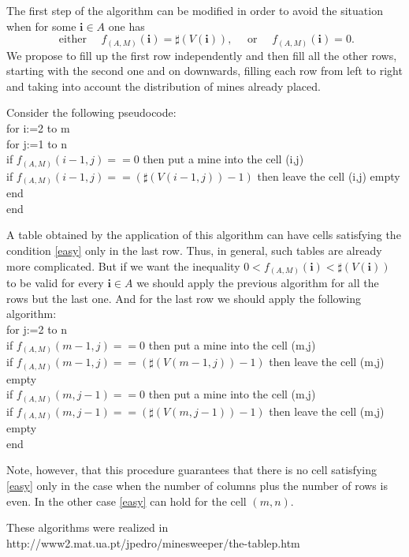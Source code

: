\documentclass[english,12pt]{article}
\theoremstyle{remark}
\theoremstyle{definition}
\theoremstyle{definition}
\newcommand{\bsi}{{\boldsymbol i}}
\begin{document}
The first step of the algorithm can be modified in order to avoid the situation when for some $\bsi
\in A$ one has
\begin{equation}\label{easy}
\text{ either }\quad f_{(A,M)}(\bsi) =\sharp(V(\bsi)),\quad\text{ or }\quad f_{(A,M)}(\bsi)=0.
\end{equation}
We propose to fill up the first row independently and then fill all the other rows, starting with
the second one and on downwards, filling each row from left to right and taking into account the
distribution of mines already placed.

Consider the following pseudocode:
\\ for i:=2 to m
\\ for j:=1 to n
\\ if $f_{(A,M)}(i-1,j)==0$ then put a mine into the cell (i,j)
\\ if $f_{(A,M)}(i-1,j)==(\sharp(V(i-1,j))-1)$ then leave the cell (i,j) empty
\\ end
\\ end

A table obtained by the application of this algorithm can have cells satisfying the condition
\eqref{easy} only in the last row. Thus, in general, such tables are already more complicated. But
if we want the inequality $0<f_{(A,M)}(\bsi)<\sharp(V(\bsi))$ to be valid for every $\bsi \in A$ we
should apply the previous algorithm for all the rows but the last one. And for the last row we
should apply the following algorithm:
\\ for j:=2 to n
\\   \quad if $f_{(A,M)}(m-1,j)==0$ then put a mine into the cell (m,j)
\\   \quad if $f_{(A,M)}(m-1,j)==(\sharp(V(m-1,j))-1)$ then leave the cell (m,j) empty
\\  \quad if $f_{(A,M)}(m,j-1)==0$ then put a mine into the cell (m,j)
\\  \quad if $f_{(A,M)}(m,j-1)==(\sharp(V(m,j-1))-1)$ then leave the cell (m,j) empty
\\ end

    Note, however, that this procedure guarantees that there is no
    cell satisfying \eqref{easy} only in the case when the number of
    columns plus the number of rows is even. In the other case \eqref{easy} can hold for the
    cell $(m,n)$.

These algorithms were realized in \\
http://www2.mat.ua.pt/jpedro/minesweeper/the-tablep.htm
\end{document}
